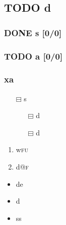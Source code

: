\documentclass[11pt]{article}
\begin{document}
\subsection{{\bfseries\sffamily TODO} d}
\label{sec:orgc63b06b}
\subsubsection{{\bfseries\sffamily DONE} s [0/0]}
\label{sec:org62369eb}

\subsubsection{{\bfseries\sffamily TODO} a [0/0]}
\label{sec:orgbf053bf}

\subsubsection{xa}
\label{sec:orgb253b41}
\begin{itemize}
\item[{$\boxminus$}] s
\begin{itemize}
\item[{$\boxminus$}] d
\item[{$\boxminus$}] d
\end{itemize}
\end{itemize}
\begin{enumerate}
\item w\hfill{}\textsc{fu}
\label{sec:org5e08f05}

\item d\hfill{}\textsc{@f}
\label{sec:org6b72a93}
\end{enumerate}

\label{errr}

\begin{fff}
  
\end{fff}



\begin{itemize}
\item de
\item d
\item ss
\end{itemize}
\end{document}
